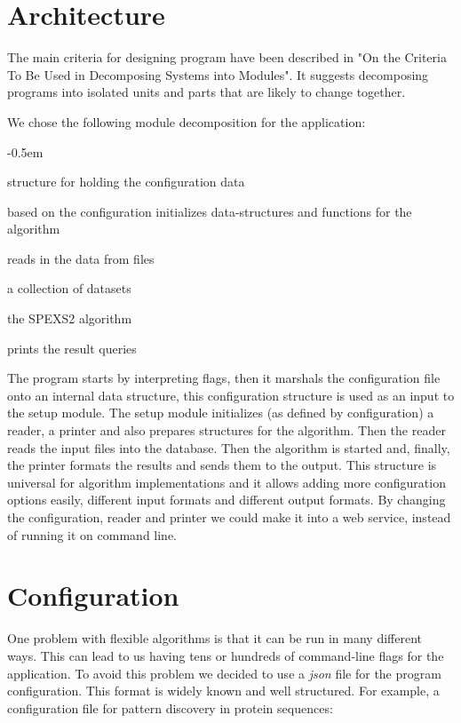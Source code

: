 \section{Architecture}

The main criteria for designing program have been described in "On the Criteria To Be Used in Decomposing Systems into Modules"\cite{Parnas72}. It suggests decomposing programs into isolated units and parts that are likely to change together.

We chose the following module decomposition for the application:

\begin{small}
\begin{description}
    \itemsep-0.5em
    \item[Configuration] structure for holding the configuration data
    \item[Setup] based on the configuration initializes data-structures and functions for the algorithm
    \item[Reader] reads in the data from files
    \item[Database] a collection of datasets
    \item[Algorithm] the SPEXS2 algorithm
    \item[Printer] prints the result queries
\end{description}
\end{small}

The program starts by interpreting flags, then it marshals the configuration file onto an internal data structure, this configuration structure is used as an input to the setup module. The setup module initializes (as defined by configuration) a reader, a printer and also prepares structures for the algorithm. Then the reader reads the input files into the database. Then the algorithm is started and, finally, the printer formats the results and sends them to the output. This structure is universal for algorithm implementations and it allows adding more configuration options easily, different input formats and different output formats. By changing the configuration, reader and printer we could make it into a web service, instead of running it on command line.

\section{Configuration}

One problem with flexible algorithms is that it can be run in many different ways. This can lead to us having tens or hundreds of command-line flags for the application. To avoid this problem we decided to use a \emph{json}\cite{json} file for the program configuration. This format is widely known and well structured. For example, a configuration file for pattern discovery in protein sequences:

